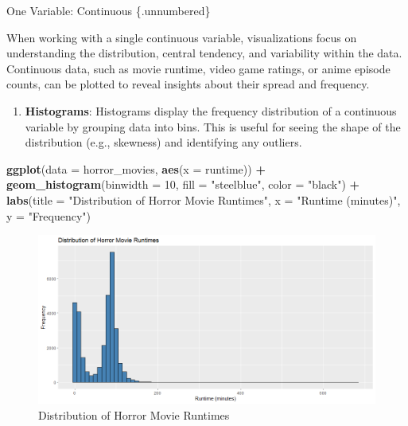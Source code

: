\documentclass[
]{book}
\newenvironment{Shaded}{\begin{snugshade}}{\end{snugshade}}
\newcommand{\AttributeTok}[1]{\textcolor[rgb]{0.13,0.29,0.53}{#1}}
\newcommand{\DecValTok}[1]{\textcolor[rgb]{0.00,0.00,0.81}{#1}}
\newcommand{\FunctionTok}[1]{\textcolor[rgb]{0.13,0.29,0.53}{\textbf{#1}}}
\newcommand{\NormalTok}[1]{#1}
\newcommand{\SpecialCharTok}[1]{\textcolor[rgb]{0.81,0.36,0.00}{\textbf{#1}}}
\newcommand{\StringTok}[1]{\textcolor[rgb]{0.31,0.60,0.02}{#1}}
\providecommand{\tightlist}{%
  \setlength{\itemsep}{0pt}\setlength{\parskip}{0pt}}
\begin{document}
One Variable: Continuous \{.unnumbered\}

When working with a single continuous variable, visualizations focus on understanding the distribution, central tendency, and variability within the data. Continuous data, such as movie runtime, video game ratings, or anime episode counts, can be plotted to reveal insights about their spread and frequency.

\begin{enumerate}
\def\labelenumi{\arabic{enumi}.}
\tightlist
\item
  \textbf{Histograms}: Histograms display the frequency distribution of a continuous variable by grouping data into bins. This is useful for seeing the shape of the distribution (e.g., skewness) and identifying any outliers.
\end{enumerate}

\begin{Shaded}
\begin{Highlighting}[]
\FunctionTok{ggplot}\NormalTok{(}\AttributeTok{data =}\NormalTok{ horror\_movies, }\FunctionTok{aes}\NormalTok{(}\AttributeTok{x =}\NormalTok{ runtime)) }\SpecialCharTok{+}
  \FunctionTok{geom\_histogram}\NormalTok{(}\AttributeTok{binwidth =} \DecValTok{10}\NormalTok{, }\AttributeTok{fill =} \StringTok{"steelblue"}\NormalTok{, }\AttributeTok{color =} \StringTok{"black"}\NormalTok{) }\SpecialCharTok{+}
  \FunctionTok{labs}\NormalTok{(}\AttributeTok{title =} \StringTok{"Distribution of Horror Movie Runtimes"}\NormalTok{, }\AttributeTok{x =} \StringTok{"Runtime (minutes)"}\NormalTok{, }\AttributeTok{y =} \StringTok{"Frequency"}\NormalTok{)}
\end{Highlighting}
\end{Shaded}

\begin{figure}
\centering
\includegraphics[width=1\textwidth,height=\textheight]{images/histogram.png}
\caption{Distribution of Horror Movie Runtimes}
\end{figure}
\end{document}
